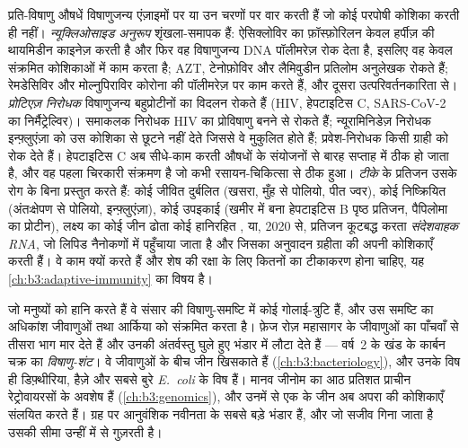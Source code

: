 \begin{definition}[प्रति-विषाणु औषधें और टीके]\label{def:b3:virology:drugs}
प्रति-विषाणु औषधें विषाणुजन्य एंज़ाइमों पर या उन चरणों पर वार करती हैं
जो कोई परपोषी कोशिका करती ही नहीं। \emph{न्यूक्लिओसाइड अनुरूप}
शृंखला-समापक हैं: ऐसिक्लोविर का फ़ॉस्फ़ोरिलन केवल हर्पीज़  की
थायमिडीन काइनेज़ करती है और फिर वह विषाणुजन्य DNA पॉलीमरेज़ रोक देता है,
इसलिए वह केवल संक्रमित कोशिकाओं में काम करता है;
AZT, टेनोफ़ोविर और लैमिवुडीन प्रतिलोम अनुलेखक रोकते हैं; रेमडेसिविर और
मोल्नुपिराविर कोरोना  की पॉलीमरेज़ पर काम करते हैं, और दूसरा
उत्परिवर्तनकारिता से। \emph{प्रोटिएज़ निरोधक} विषाणुजन्य
बहुप्रोटीनों का विदलन रोकते हैं (HIV, हेपटाइटिस C, SARS-CoV-2 का
निर्मैट्रेल्विर)। समाकलक निरोधक HIV का प्रोविषाणु बनने से रोकते हैं;
न्यूरामिनिडेज़ निरोधक इन्फ़्लुएंज़ा  को उस कोशिका से छूटने
नहीं देते जिससे वे मुकुलित होते हैं; प्रवेश-निरोधक किसी ग्राही को रोक
देते हैं। हेपटाइटिस C  अब सीधे-काम करती औषधों के संयोजनों से
बारह सप्ताह में ठीक हो जाता है, और वह पहला चिरकारी  संक्रमण है जो
कभी रसायन-चिकित्सा से ठीक हुआ। \emph{टीके}  के प्रतिजन उसके रोग
के बिना प्रस्तुत करते हैं: कोई जीवित दुर्बलित  (खसरा,
मुँह से पोलियो, पीत ज्वर), कोई निष्क्रियित  (अंतःक्षेपण से
पोलियो, इन्फ़्लुएंज़ा), कोई उपइकाई (खमीर में बना हेपटाइटिस B पृष्ठ
प्रतिजन, पैपिलोमा  का  प्रोटीन), लक्ष्य का कोई जीन ढोता
कोई हानिरहित  , या, 2020 से, प्रतिजन कूटबद्ध करता
\emph{संदेशवाहक RNA}, जो लिपिड नैनोकणों में पहुँचाया जाता है और जिसका
अनुवादन ग्रहीता की अपनी कोशिकाएँ करती हैं। वे काम क्यों करते हैं और
शेष की रक्षा के लिए कितनों का टीकाकरण होना चाहिए, यह
\cref{ch:b3:adaptive-immunity} का विषय है।
\end{definition}

\begin{remark}[जीवन की अर्थव्यवस्था में विषाणु]\label{rem:b3:virology:economy}
जो  मनुष्यों को हानि करते हैं वे संसार की विषाणु-समष्टि में कोई
गोलाई-त्रुटि हैं, और उस समष्टि का अधिकांश जीवाणुओं तथा आर्किया को
संक्रमित करता है। फ़ेज रोज़ महासागर के जीवाणुओं का पाँचवाँ से तीसरा भाग
मार देते हैं और उनकी अंतर्वस्तु घुले हुए भंडार में लौटा देते हैं ---
वर्ष~2 के खंड के कार्बन चक्र का \emph{विषाणु-शंट}। वे जीवाणुओं के बीच
जीन खिसकाते हैं (\cref{ch:b3:bacteriology}), और उनके विष ही
डिफ़्थीरिया, हैज़े और सबसे बुरे \emph{E.~coli} के विष हैं। मानव जीनोम का
आठ प्रतिशत प्राचीन रेट्रोवायरसों के अवशेष हैं
(\cref{ch:b3:genomics}), और उनमें से एक के  जीन अब अपरा की
कोशिकाएँ संलयित करते हैं।  ग्रह पर आनुवंशिक नवीनता के सबसे बड़े
भंडार हैं, और जो सजीव गिना जाता है उसकी सीमा उन्हीं में से गुज़रती है।
\end{remark}

